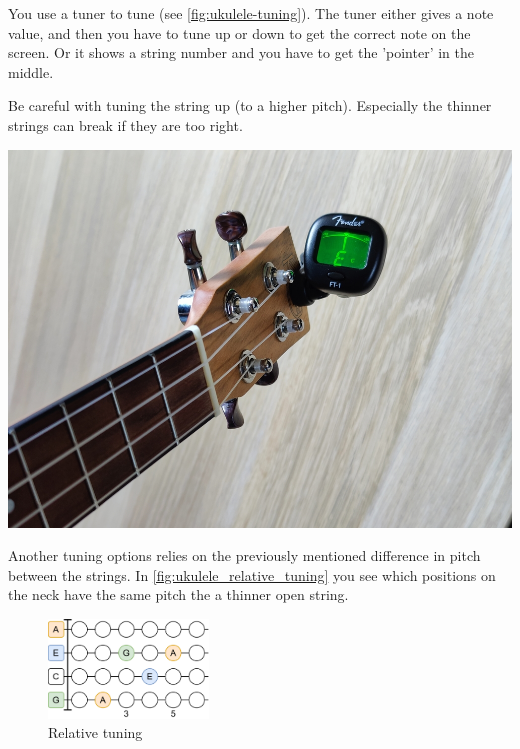 \begin{minipage}{0.5\textwidth}
You use a tuner to tune (see \autoref{fig:ukulele-tuning}). The tuner either gives a note value, and then you have to tune up or down to get the correct note on the screen. Or it shows a string number and you have to get the 'pointer' in the middle.

Be careful with tuning the string up (to a higher pitch). Especially the thinner strings can break if they are too right.
\end{minipage}
\hfill
\begin{minipage}{0.3\textwidth}
	\centering
	\includegraphics[width=\textwidth]{../../Images/ukulele-tuning.jpg}
	\label{fig:ukulele-tuning}
\end{minipage}

Another tuning options relies on the previously mentioned difference in pitch between the strings. In \autoref{fig:ukulele_relative_tuning} you see which positions on the neck have the same pitch the a thinner open string.

\begin{figure}[h]
	\centering
	\includegraphics[width=0.38\textwidth]{../../Images/UkuleleRelativeTuning.png}
	\caption{Relative tuning}
	\label{fig:ukulele_relative_tuning}
\end{figure}
